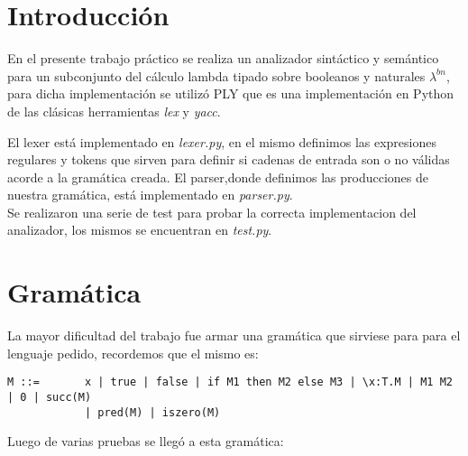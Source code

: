 \documentclass[spanish, a4paper]{article}
\begin{document}
\fecha{\today}



\maketitle


\newpage
\section{Introducción}
En el presente trabajo práctico se realiza un analizador sintáctico y semántico para un subconjunto del cálculo lambda tipado sobre booleanos y naturales $\lambda^{bn}$, para dicha implementación se utilizó PLY que es una implementación en Python de las clásicas herramientas \textit{lex} y \textit{yacc}.

El lexer está implementado en \textit{lexer.py}, en el mismo definimos las expresiones regulares y tokens que sirven para definir si cadenas de entrada son o no válidas acorde a la gramática creada. El parser,donde definimos las producciones de nuestra gramática, está implementado en \textit{parser.py}.\\
Se realizaron una serie de test para probar la correcta implementacion del analizador, los mismos se encuentran en \textit{test.py}.

\newpage
\section{Gramática}

La mayor dificultad del trabajo fue armar una gramática que sirviese para para el lenguaje pedido, recordemos que el mismo es:

\begin{verbatim}
M ::= 		x | true | false | if M1 then M2 else M3 | \x:T.M | M1 M2 | 0 | succ(M) 
            | pred(M) | iszero(M)
\end{verbatim}

Luego de varias pruebas se llegó a esta gramática:
\end{document}
